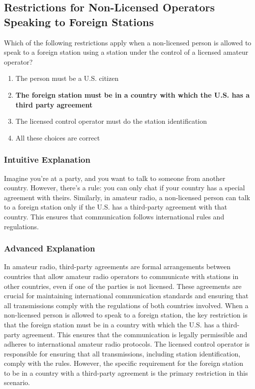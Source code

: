\subsection{Restrictions for Non-Licensed Operators Speaking to Foreign Stations}
\label{T1F07}

\begin{tcolorbox}[colback=gray!10!white,colframe=black!75!black,title=T1F07]
Which of the following restrictions apply when a non-licensed person is allowed to speak to a foreign station using a station under the control of a licensed amateur operator?
\begin{enumerate}[label=\Alph*),noitemsep]
    \item The person must be a U.S. citizen
    \item \textbf{The foreign station must be in a country with which the U.S. has a third party agreement}
    \item The licensed control operator must do the station identification
    \item All these choices are correct
\end{enumerate}
\end{tcolorbox}

\subsubsection{Intuitive Explanation}
Imagine you're at a party, and you want to talk to someone from another country. However, there's a rule: you can only chat if your country has a special agreement with theirs. Similarly, in amateur radio, a non-licensed person can talk to a foreign station only if the U.S. has a third-party agreement with that country. This ensures that communication follows international rules and regulations.

\subsubsection{Advanced Explanation}
In amateur radio, third-party agreements are formal arrangements between countries that allow amateur radio operators to communicate with stations in other countries, even if one of the parties is not licensed. These agreements are crucial for maintaining international communication standards and ensuring that all transmissions comply with the regulations of both countries involved. When a non-licensed person is allowed to speak to a foreign station, the key restriction is that the foreign station must be in a country with which the U.S. has a third-party agreement. This ensures that the communication is legally permissible and adheres to international amateur radio protocols. The licensed control operator is responsible for ensuring that all transmissions, including station identification, comply with the rules. However, the specific requirement for the foreign station to be in a country with a third-party agreement is the primary restriction in this scenario.